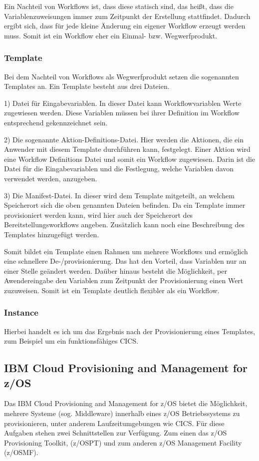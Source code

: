 Ein Nachteil von Workflows ist, dass diese statisch sind, das heißt, dass die Variablenzuweisungen immer zum Zeitpunkt der Erstellung stattfindet.
Dadurch ergibt sich, dass für jede kleine Änderung ein eigener Workflow erzeugt werden muss.
Somit ist ein Workflow eher ein Einmal- bzw. Wegwerfprodukt.

\subsubsection{Template}
Bei dem Nachteil von Workflows als Wegwerfprodukt setzen die sogenannten Templates an.
Ein Template besteht aus drei Dateien.

1) Datei für Eingabevariablen.
In dieser Datei kann Workflowvariablen Werte zugewiesen werden.
Diese Variablen müssen bei ihrer Definition im Workflow entsprechend gekennzeichnet sein.

2) Die sogenannte Aktion-Definitions-Datei.
Hier werden die Aktionen, die ein Anwender mit diesem Template durchführen kann, festgelegt.
Einer Aktion wird eine Workflow Definitions Datei und somit ein Workflow zugewiesen.
Darin ist die Datei für die Eingabevariablen und die Festlegung, welche Variablen davon verwendet werden, anzugeben.

3) Die Manifest-Datei.
In dieser wird dem Template mitgeteilt, an welchem Speicherort sich die oben genannten Dateien befinden.
Da ein Template immer provisioniert werden kann, wird hier auch der Speicherort des Bereitstellungsworkflows angeben.
Zusätzlich kann noch eine Beschreibung des Templates hinzugefügt werden.

Somit bildet ein Template einen Rahmen um mehrere Workflows und ermöglich eine schnellere De-/provisionierung.
Das hat den Vorteil, dass Variablen nur an einer Stelle geändert werden.
Daüber hinaus besteht die Möglichkeit, per Awendereingabe den Variablen zum Zeitpunkt der Provisionierung einen Wert zuzuweisen.
Somit ist ein Template deutlich flexibler als ein Workflow.
\cite{IBM.2019}

\subsubsection{Instance}\label{sssec:instance}
Hierbei handelt es ich um das Ergebnis nach der Provisionierung eines Templates,
zum Beispiel um ein funktionsfähiges CICS.

\subsection{IBM Cloud Provisioning and Management for z/OS}
Das IBM Cloud Provisioning and Management for z/OS bietet die Möglichkeit, mehrere Systeme (sog. Middleware) innerhalb eines z/OS Betriebssystems zu provisionieren, unter anderem Laufzeitumgebungen wie CICS. 
Für diese Aufgaben stehen zwei Schnittstellen zur Verfügung.
Zum einen das z/OS Provisioning Toolkit, (z/OSPT) und zum anderen z/OS Management Facility (z/OSMF).
\cite{KeithWinnardGaryPuchkoffHirenShah.2016}

